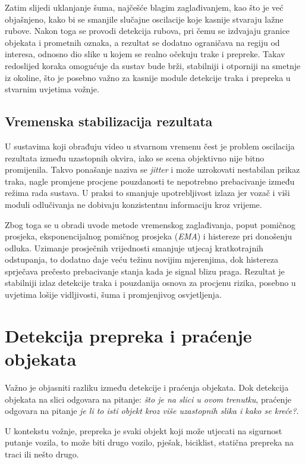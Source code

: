 Zatim slijedi uklanjanje šuma, najčešće blagim zaglađivanjem, kao što je već objašnjeno, kako bi se smanjile slučajne oscilacije koje kasnije stvaraju lažne rubove. Nakon toga se provodi detekcija rubova, pri čemu se izdvajaju granice objekata i prometnih oznaka, a rezultat se dodatno ograničava na regiju od interesa, odnosno dio slike u kojem se realno očekuju trake i prepreke. Takav redoslijed koraka omogućuje da sustav bude brži, stabilniji i otporniji na smetnje iz okoline, što je posebno važno za kasnije module detekcije traka i prepreka u stvarnim uvjetima vožnje.

\subsection{Vremenska stabilizacija rezultata}
U sustavima koji obrađuju video u stvarnom vremenu čest je problem oscilacija rezultata između uzastopnih okvira, iako se scena objektivno nije bitno promijenila. Takvo ponašanje naziva se \textit{jitter} i može uzrokovati nestabilan prikaz traka, nagle promjene procjene pouzdanosti te nepotrebno prebacivanje između režima rada sustava. U praksi to smanjuje upotrebljivost izlaza jer vozač i viši moduli odlučivanja ne dobivaju konzistentnu informaciju kroz vrijeme.

Zbog toga se u obradi uvode metode vremenskog zaglađivanja, poput pomičnog prosjeka, eksponencijalnog pomičnog prosjeka (\textit{EMA}) i histereze pri donošenju odluka. Uzimanje prosječnih vrijednosti smanjuje utjecaj kratkotrajnih odstupanja, to dodatno daje veću težinu novijim mjerenjima, dok histereza sprječava prečesto prebacivanje stanja kada je signal blizu praga. Rezultat je stabilniji izlaz detekcije traka i pouzdanija osnova za procjenu rizika, posebno u uvjetima lošije vidljivosti, šuma i promjenjivog osvjetljenja.

\section{Detekcija prepreka i praćenje objekata}
Važno je objasniti razliku između detekcije i praćenja objekata. Dok detekcija objekata na slici odgovara na pitanje: \textit{što je na slici u ovom trenutku}, praćenje odgovara na pitanje \textit{je li to isti objekt kroz više uzastopnih slika i kako se kreće?}.

U kontekstu vožnje, prepreka je svaki objekt koji može utjecati na sigurnost putanje vozila, to može biti drugo vozilo, pješak, biciklist, statična prepreka na traci ili nešto drugo.


